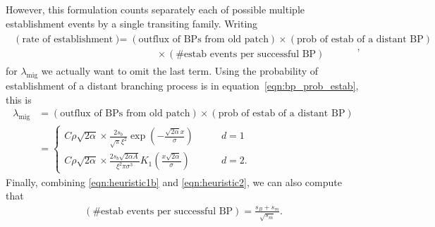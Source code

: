 \documentclass{article}
\newcommand{\migrate}{\lambda_\text{mig}}
\begin{document}
However, this formulation counts separately each of possible multiple establishment events by a single transiting family.
Writing
\begin{align} \label{eqn:heuristic2}
  \begin{split} (\mbox{rate of establishment}) &= (\mbox{outflux of BPs from old patch}) \times (\mbox{prob of estab of a distant BP}) \\
  & \qquad \qquad \times (\mbox{\# estab events per successful BP}) \end{split},
\end{align}
for $\migrate$ we actually want to omit the last term.
Using the probability of establishment of a distant branching process is in equation~\eqref{eqn:bp_prob_estab}, this is
\begin{align}
  \migrate &= (\mbox{outflux of BPs from old patch}) \times (\mbox{prob of estab of a distant BP}) \\
           &= \begin{cases}
    C \rho \sqrt{2 \alpha} \times \frac{2 s_b}{\sqrt{\pi} \xi^2} \exp\left(- \frac{\sqrt{2\alpha}x}{\sigma} \right)  \qquad & d=1 \\
    C \rho \sqrt{2 \alpha} \times \frac{ 2 s_b \sqrt{2 \alpha A} }{ \xi^2 \pi \sigma^3} K_1\left(\frac{x\sqrt{2\alpha}}{\sigma}\right)  \qquad & d=2 .
\end{cases}
\end{align}
Finally, combining \eqref{eqn:heuristic1b} and \eqref{eqn:heuristic2}, we can also compute that
\begin{align}
  (\mbox{\# estab events per successful BP}) = \frac{s_B+s_m}{ \sqrt{s_m} } .
\end{align}
\end{document}
